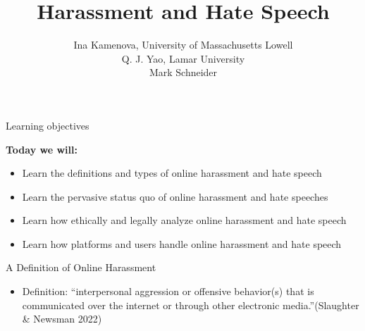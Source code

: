 \documentclass[nobackground,dvipsnames,table]{beamer}
\title[Harassment and Hate Speech]{Harassment and Hate Speech}
\author[]{Ina Kamenova, University of Massachusetts Lowell \\
Q. J. Yao, Lamar University \\ Mark Schneider}
\date[]{}
\begin{document}

\begin{frame}
    \titlepage
\end{frame}

\begin{frame}{Learning objectives}

\textbf{Today we will:}

\begin{itemize}
    \item Learn the definitions and types of online harassment and hate speech
    \item Learn the pervasive status quo of online harassment and hate speeches
    \item Learn how ethically and legally analyze online harassment and hate speech
    \item Learn how platforms and users handle online harassment and hate speech
\end{itemize}

\end{frame}


\begin{frame}{A Definition of Online Harassment}

\begin{itemize}
    \item Definition: “interpersonal aggression or offensive behavior(s) that is communicated over the internet or through other electronic media.”(Slaughter \& Newsman 2022)
\end{itemize}

\end{frame}
\end{document}
